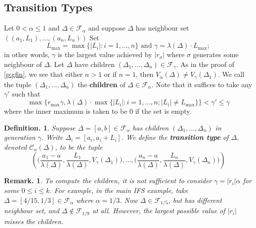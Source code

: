 \documentclass[11pt, a4paper]{memoir}
\theoremstyle{change}
\theoremstyle{plain}
\theoremstyle{nonumberplain}
\newtheorem{definition}{Definition.}
\newtheorem{remark}{Remark.}
\numberwithin{equation}{section}
\begin{document}
\subsection{Transition Types}
Let $0<\alpha\leq 1$ and $\Delta\in\mathcal{F}_\alpha$ and suppose $\Delta$ has neighbour set $((a_1,L_1),\ldots,(a_n,L_n))$
Set
\begin{equation*}
    L_{\max}=\max\{|L_i|:i=1,\ldots,n\}\text{ and }\gamma = \lambda(\Delta)\cdot L_{\max};
\end{equation*}
in other words, $\gamma$ is the largest value achieved by $|r_\sigma|$ where $\sigma$ generates some neighbour of $\Delta$.
Let $\Delta$ have children $(\Delta_1,\ldots,\Delta_n)\in\mathcal{F}_\gamma$.
As in the proof of \cref{p:gfin}, we see that either $n>1$ or if $n=1$, then $V_\alpha(\Delta)\neq V_\gamma(\Delta_1)$.
We call the tuple $(\Delta_1,\ldots,\Delta_n)$ the \textbf{children} of $\Delta\in\mathcal{F}_\alpha$.
Note that it suffices to take any $\gamma'$ such that
\begin{equation*}
    \max\bigl\{r_{\max}\gamma,\lambda(\Delta)\cdot\max\{|L_i|:i=1,\ldots,n; |L_i|\neq L_{\max}\}\bigr\}<\gamma'\leq\gamma
\end{equation*}
where the inner maximum is taken to be 0 if the set is empty.
\begin{definition}
    Suppose $\Delta=[a,b]\in\mathcal{F}_\alpha$ has children $(\Delta_1,\ldots,\Delta_n)$ in generation $\gamma$.
    Write $\Delta_i=[a_i,a_i+L_i]$.
    We define the \textbf{transition type} of $\Delta$, denoted $\mathcal{C}_\alpha(\Delta)$, to be the tuple
    \begin{equation*}
        \left(\bigl(\frac{a_1-a}{\lambda(\Delta)},\frac{L_1}{\lambda(\Delta)},V_\gamma(\Delta_1)\bigr),\ldots,\bigl(\frac{a_n-a}{\lambda(\Delta)},\frac{L_n}{\lambda(\Delta)},V_\gamma(\Delta_n)\bigr)\right)
    \end{equation*}
\end{definition}
\begin{remark}
    To compute the children, it is not sufficient to consider $\gamma=|r_i|\alpha$ for some $0\leq i \leq k$.
    For example, in the main IFS example, take $\Delta=[4/15, 1/3]\in\mathcal{F}_\alpha$ where $\alpha=1/3$.
    Now $\Delta\in \mathcal{F}_{1/5}$, but has different neighbour set, and $\Delta\notin\mathcal{F}_{1/9}$ at all.
    However, the largest possible value of $|r_i|$ misses the children.
\end{remark}
\end{document}
